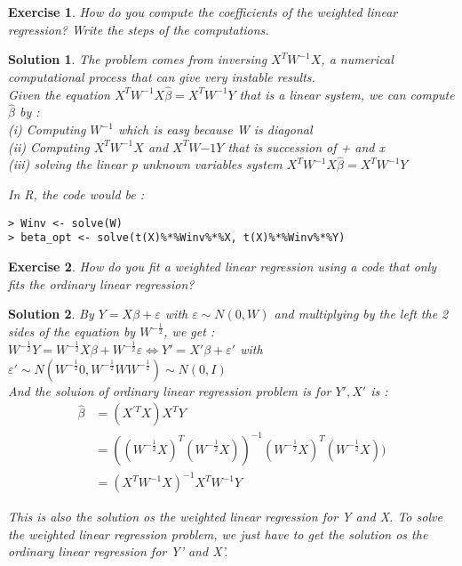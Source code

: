 \documentclass[12pt,a4paper]{article}
\newtheorem{exercise}{Exercise}
\newtheorem{solution}{Solution}
\begin{document}
\begin{exercise}
How do you compute the coefficients of the weighted linear regression? Write the steps of the computations.
\end{exercise}
\begin{solution}
The problem comes from inversing $X^T W^{-1} X$, a numerical computational process that can give very instable results.\\

Given the equation $X^T W^{-1} X \hat \beta = X^TW^{-1}Y$ that is a linear system, we can compute $\hat \beta$ by :\\
(i) Computing $W^{-1}$ which is easy because W is diagonal\\
(ii) Computing $X^T W^{-1} X$ and $X^TW{-1}Y$ that is succession of + and x\\
(iii) solving the linear p unknown variables system $X^T W^{-1} X \hat \beta = X^TW^{-1}Y$

In R, the code would be :  
\begin{verbatim}
> Winv <- solve(W)
> beta_opt <- solve(t(X)%*%Winv%*%X, t(X)%*%Winv%*%Y)
\end{verbatim}
\end{solution}

\begin{exercise}
How do you fit a weighted linear regression using a code that only fits the ordinary linear regression?
\end{exercise}
\begin{solution}
By $Y = X\beta + \varepsilon$ with $\varepsilon \sim N(0,W)$ and multiplying by the left the 2 sides of the equation by $W^{-\frac{1}{2}}$, we get :\\
$W^{-\frac{1}{2}} Y = W^{-\frac{1}{2}} X\beta + W^{-\frac{1}{2}} \varepsilon \Longleftrightarrow Y' = X'\beta + \varepsilon'$ with $\varepsilon' \sim N(W^{-\frac{1}{2}} 0,W^{-\frac{1}{2}} W W^{-\frac{1}{2}}) \sim N(0,I)$\\

And the soluion of ordinary linear regression problem is for $Y', X'$ is : \\
\begin{equation}
\begin{split}
\hat \beta & = (X^{'T}X)X^T Y\\
& = ((W^{-\frac{1}{2}} X)^T (W^{-\frac{1}{2}} X))^{-1} (W^{-\frac{1}{2}} X)^T (W^{-\frac{1}{2}} X)) \\
& = (X^T W^{-1} X)^{-1} X^T W^{-1} Y
 \end{split}
\end{equation}

This is also the solution os the weighted linear regression for Y and X. To solve the weighted linear regression problem, we just have to get the solution os the ordinary linear regression for Y' and X'. 
\end{solution}
\end{document}
